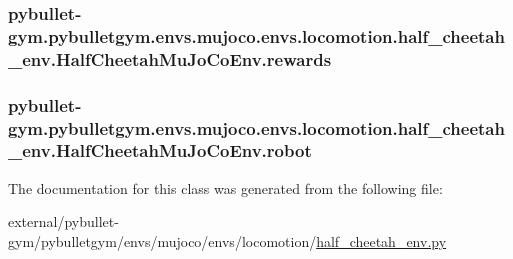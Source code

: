 \subsubsection[{\texorpdfstring{rewards}{rewards}}]{\setlength{\rightskip}{0pt plus 5cm}pybullet-\/gym.\+pybulletgym.\+envs.\+mujoco.\+envs.\+locomotion.\+half\+\_\+cheetah\+\_\+env.\+Half\+Cheetah\+Mu\+Jo\+Co\+Env.\+rewards}\hypertarget{classpybullet-gym_1_1pybulletgym_1_1envs_1_1mujoco_1_1envs_1_1locomotion_1_1half__cheetah__env_1_1_half_cheetah_mu_jo_co_env_a9d7b17418c8d9c4b55376a6ec8ee028c}{}\label{classpybullet-gym_1_1pybulletgym_1_1envs_1_1mujoco_1_1envs_1_1locomotion_1_1half__cheetah__env_1_1_half_cheetah_mu_jo_co_env_a9d7b17418c8d9c4b55376a6ec8ee028c}
\subsubsection[{\texorpdfstring{robot}{robot}}]{\setlength{\rightskip}{0pt plus 5cm}pybullet-\/gym.\+pybulletgym.\+envs.\+mujoco.\+envs.\+locomotion.\+half\+\_\+cheetah\+\_\+env.\+Half\+Cheetah\+Mu\+Jo\+Co\+Env.\+robot}\hypertarget{classpybullet-gym_1_1pybulletgym_1_1envs_1_1mujoco_1_1envs_1_1locomotion_1_1half__cheetah__env_1_1_half_cheetah_mu_jo_co_env_aba6cd8cdba0c91ca579243b8545501e3}{}\label{classpybullet-gym_1_1pybulletgym_1_1envs_1_1mujoco_1_1envs_1_1locomotion_1_1half__cheetah__env_1_1_half_cheetah_mu_jo_co_env_aba6cd8cdba0c91ca579243b8545501e3}


The documentation for this class was generated from the following file\+:\begin{DoxyCompactItemize}
\item 
external/pybullet-\/gym/pybulletgym/envs/mujoco/envs/locomotion/\hyperlink{mujoco_2envs_2locomotion_2half__cheetah__env_8py}{half\+\_\+cheetah\+\_\+env.\+py}\end{DoxyCompactItemize}

